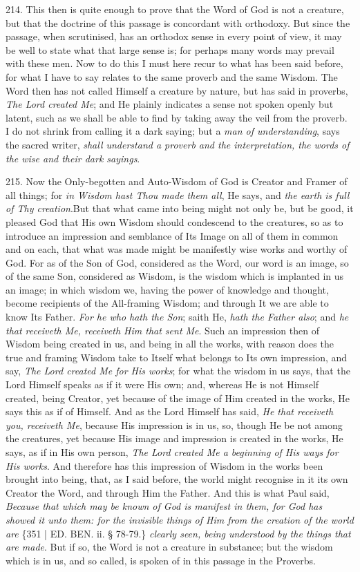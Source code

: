 214. This then is quite enough
to prove that the Word of God is not a creature, but that the doctrine
of this passage is concordant with orthodoxy. But since the passage,
when scrutinised, has an orthodox sense in every point of view, it may
be well to state what that large sense is; for perhaps many words may
prevail with these men. Now to do this I must here recur to what has
been said before, for what I have to say relates to the same proverb
and the same Wisdom. The Word then has not called Himself a creature
by nature, but has said in proverbs, \emph{The Lord created Me}; and
He plainly indicates a sense not spoken openly but latent, such as we
shall be able to find by taking away the veil from the proverb. I do
not shrink from calling it a dark saying; but a \emph{man of understanding},
says the sacred writer, \emph{shall understand a proverb and the
interpretation, the words of the wise and their dark sayings}.

215. Now the Only-begotten and
Auto-Wisdom of God is Creator and Framer of all things; for \emph{in
Wisdom hast Thou made them all}, He says, and \emph{the earth is full
of Thy creation}.\emph{}But that what came into being might not
only be, but be good, it pleased God that His own Wisdom should
condescend to the creatures, so as to introduce an impression and
semblance of Its Image on all of them in common and on each, that what
was made might be manifestly wise works and worthy of God. For as of
the Son of God, considered as the Word, our word is an image, so of
the same Son, considered as Wisdom, is the wisdom which is implanted
in us an image; in which wisdom we, having the power of knowledge and
thought, become recipients of the All-framing Wisdom; and through It
we are able to know Its Father. \emph{For he who hath the Son}; saith
He, \emph{hath the Father also}; and \emph{he that receiveth Me,
receiveth Him that sent Me}. Such an impression then of Wisdom
being created in us, and being in all the works, with reason does the
true and framing Wisdom take to Itself what belongs to Its own
impression, and say, \emph{The Lord created Me for His works}; for
what the wisdom in us says, that the Lord Himself speaks as if it were
His own; and, whereas He is not Himself created, being Creator, yet
because of the image of Him created in the works, He says this as if
of Himself. And as the Lord Himself has said, \emph{He that receiveth
you, receiveth Me}, because His impression is in us, so, though He
be not among the creatures, yet because His image and impression is
created in the works, He says, as if in His own person, \emph{The Lord
created Me a beginning of His ways for His works}. And therefore
has this impression of Wisdom in the works been brought into being,
that, as I said before, the world might recognise in it its own
Creator the Word, and through Him the Father. And this is what Paul
said, \emph{Because that which may be known of God is manifest in them,
for God has showed it unto them: for the invisible things of Him from
the creation of the world are} \{351 | ED. BEN.
ii. § 78-79.\} \emph{clearly seen, being understood by the things that
are made}. But if so, the Word is not a creature in substance; but
the wisdom which is in us, and so called, is spoken of in this passage
in the Proverbs.

